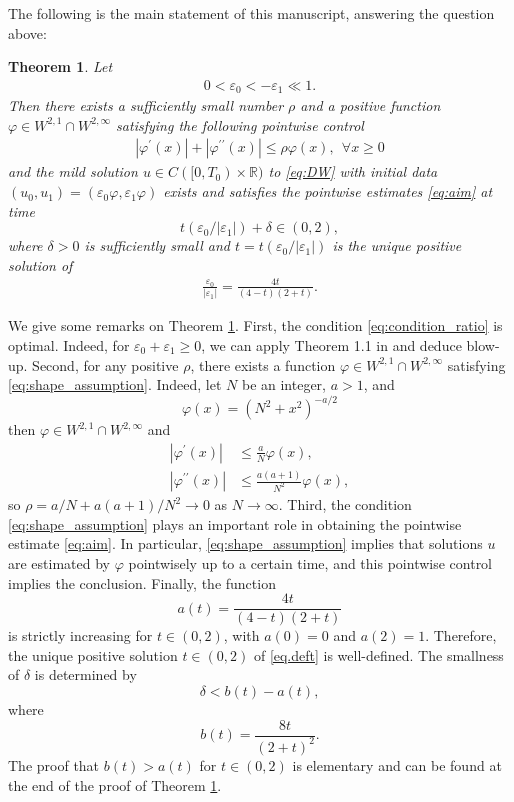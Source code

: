 \documentclass[reqno]{amsart}
\newtheorem{Theorem}{Theorem}[section]
\begin{document}
The following is the main statement of this manuscript,
answering the question above:
\begin{Theorem}\label{theorem:main}
Let
	\begin{align}
	0 < \varepsilon_0 < -\varepsilon_1 \ll 1.
	\label{eq:condition_ratio}
	\end{align}
Then there exists a sufficiently small number $\rho$ and
a positive function $\varphi \in W^{2,1} \cap W^{2,\infty}$
satisfying the following pointwise control
	\begin{align}\label{eq:shape_assumption} \tag{H1}
	|\varphi^\prime(x)| + |\varphi^{\prime\prime} (x)| \leq \rho  \varphi(x) , \ \ \forall x \geq 0
	\end{align}
and the mild solution $u \in C([0,T_0) \times \mathbb{R})$ to \eqref{eq:DW}
with initial data $(u_0,u_1) = (\varepsilon_0 \varphi, \varepsilon_1 \varphi)$
exists and satisfies the pointwise estimates \eqref{eq:aim}
at time
	\[
	t(\varepsilon_0/|\varepsilon_1|)+\delta \in (0,2),
	\]
where $\delta>0$ is sufficiently small
and $t=t(\varepsilon_0/|\varepsilon_1|)$ is the unique positive solution 
of 
	\begin{align}\label{eq.deft}
	\frac{\varepsilon_0}{|\varepsilon_1|} =  \frac{4t}{(4-t)(2+t)}.
	\end{align}
\end{Theorem}

We give some remarks on Theorem \ref{theorem:main}.
First,
the condition \eqref{eq:condition_ratio} is optimal.
Indeed, for $\varepsilon_0 + \varepsilon_1 \geq 0$,
we can apply Theorem 1.1 in \cite{FG25a} and deduce blow-up.
Second,
for any positive $\rho$,
there exists a function $\varphi \in W^{2,1} \cap W^{2,\infty}$
satisfying \eqref{eq:shape_assumption}.
Indeed, let $N$ be an integer, $a >1$, and
	\[
	\varphi(x) = (N^2+x^2)^{-a/2}
	\]
then $\varphi \in W^{2,1} \cap W^{2,\infty}$ and
	\begin{align*}
	|\varphi^\prime(x)| &\leq \frac{a}{N} \varphi(x),\\
	|\varphi^{\prime\prime}(x)| &\leq \frac{a(a+1)}{N^2} \varphi(x),
	\end{align*}
so $\rho = a/N + a(a+1)/N^2 \to 0$ as $N \to \infty.$
Third,
the condition \eqref{eq:shape_assumption} plays an important role
in obtaining the pointwise estimate \eqref{eq:aim}.
In particular, \eqref{eq:shape_assumption} implies that
solutions $u$ are estimated by $\varphi$ pointwisely up to a certain time,
and this pointwise control implies the conclusion.
Finally,
the function
	\[
	a(t) = \frac{4t}{(4-t)(2+t)}
	\]
is strictly increasing for $t \in (0,2)$, with $a(0)=0$ and $a(2)=1$.
Therefore, the unique positive solution $t \in (0,2)$ of \eqref{eq.deft} is well-defined.
The smallness of $\delta$ is determined by
	\[
	\delta < b(t)-a(t),
	\]
where
	\[
	b(t) = \frac{8t}{(2+t)^2}.
	\]
The proof that $b(t)>a(t)$ for $t \in (0,2)$ is elementary
and can be found at the end of the proof of Theorem \ref{theorem:main}.
\end{document}
